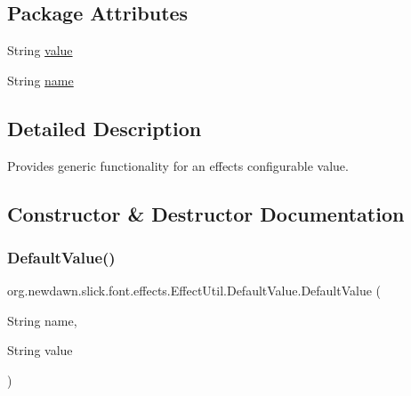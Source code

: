\subsection*{Package Attributes}
\begin{DoxyCompactItemize}
\item 
String \mbox{\hyperlink{classorg_1_1newdawn_1_1slick_1_1font_1_1effects_1_1_effect_util_1_1_default_value_a0bc4a9aca1a1dd586fe8580d9e68c8fd}{value}}
\item 
String \mbox{\hyperlink{classorg_1_1newdawn_1_1slick_1_1font_1_1effects_1_1_effect_util_1_1_default_value_ae33082e2b5adea01e0d97dbf24d03170}{name}}
\end{DoxyCompactItemize}


\subsection{Detailed Description}
Provides generic functionality for an effect\textquotesingle{}s configurable value. 

\subsection{Constructor \& Destructor Documentation}
\mbox{\label{classorg_1_1newdawn_1_1slick_1_1font_1_1effects_1_1_effect_util_1_1_default_value_a08456338c961a517bac78427f0f56f4c}} 
\subsubsection{\texorpdfstring{Default\+Value()}{DefaultValue()}}
{\footnotesize\ttfamily org.\+newdawn.\+slick.\+font.\+effects.\+Effect\+Util.\+Default\+Value.\+Default\+Value (\begin{DoxyParamCaption}\item[{String}]{name,  }\item[{String}]{value }\end{DoxyParamCaption})\hspace{0.3cm}{\ttfamily [inline]}}

